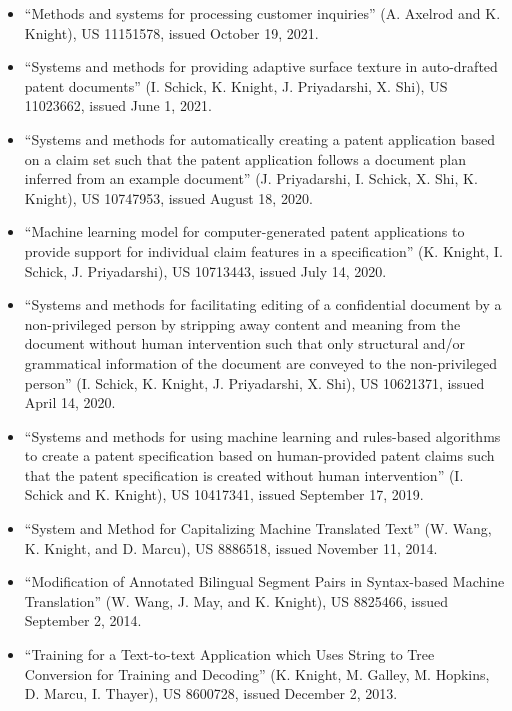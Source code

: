 {}

\begin{itemize}
\item ``Methods and systems for processing customer inquiries'' (A. Axelrod and K. Knight), US 11151578, issued October 19, 2021.

\item ``Systems and methods for providing adaptive surface texture in auto-drafted patent documents'' (I. Schick, K. Knight, J. Priyadarshi, X. Shi), US 11023662, issued June 1, 2021.

\item ``Systems and methods for automatically creating a patent application based on a claim set such that the patent application follows a document plan inferred from an example document'' (J. Priyadarshi, I. Schick, X. Shi, K. Knight), US 10747953, issued August 18, 2020.

\item ``Machine learning model for computer-generated patent applications to provide support for individual claim features in a specification'' (K. Knight, I. Schick, J. Priyadarshi), US 10713443, issued July 14, 2020.

\item ``Systems and methods for facilitating editing of a confidential document by a non-privileged person by stripping away content and meaning from the document without human intervention such that only structural and/or grammatical information of the document are conveyed to the non-privileged person'' (I. Schick, K. Knight, J. Priyadarshi, X. Shi), US 10621371, issued April 14, 2020.

\item ``Systems and methods for using machine learning and rules-based algorithms to create a patent specification based on human-provided patent claims such that the patent specification is created without human intervention'' (I. Schick and K. Knight), US 10417341, issued September 17, 2019.

\item ``System and Method for Capitalizing Machine Translated Text'' (W. Wang, K. Knight, and D. Marcu), 
US 8886518, issued November 11, 2014.

\item ``Modification of Annotated Bilingual Segment Pairs in Syntax-based Machine Translation'' (W. Wang, J. May, and K. Knight), 
US 8825466, issued September 2, 2014.

\item ``Training for a Text-to-text Application which Uses String to Tree Conversion for Training and Decoding'' (K. Knight, M. Galley, M. Hopkins, D. Marcu, I. Thayer), 
US 8600728, issued December 2, 2013.


\end{itemize}
